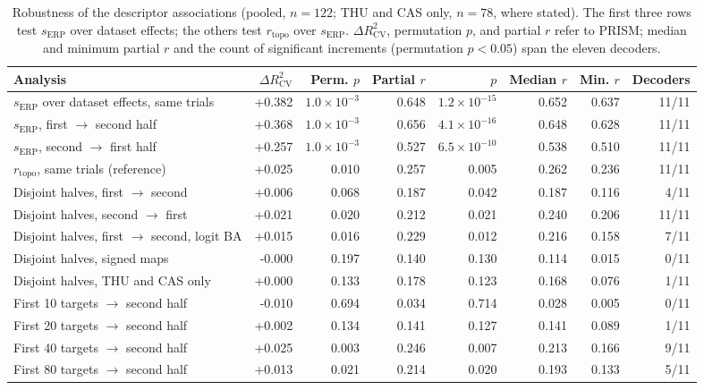 \begin{table}[H]
\centering
\caption{Robustness of the descriptor associations (pooled, $n=122$; THU and CAS only, $n=78$, where stated). The first three rows test $s_\mathrm{ERP}$ over dataset effects; the others test $r_\mathrm{topo}$ over $s_\mathrm{ERP}$. $\Delta R^2_\mathrm{CV}$, permutation $p$, and partial $r$ refer to PRISM; median and minimum partial $r$ and the count of significant increments (permutation $p<0.05$) span the eleven decoders.}
\label{tab:supp-robustness}
\scriptsize
\begin{adjustbox}{max width=\textwidth}
\begin{tabular}{@{}lrrrrrrr@{}}
\toprule
Analysis & $\Delta R^2_\mathrm{CV}$ & Perm. $p$ & Partial $r$ & $p$ & Median $r$ & Min. $r$ & Decoders \\
\midrule
$s_\mathrm{ERP}$ over dataset effects, same trials & +0.382 & $1.0\times10^{-3}$ & 0.648 & $1.2\times10^{-15}$ & 0.652 & 0.637 & 11/11 \\
$s_\mathrm{ERP}$, first $\to$ second half & +0.368 & $1.0\times10^{-3}$ & 0.656 & $4.1\times10^{-16}$ & 0.648 & 0.628 & 11/11 \\
$s_\mathrm{ERP}$, second $\to$ first half & +0.257 & $1.0\times10^{-3}$ & 0.527 & $6.5\times10^{-10}$ & 0.538 & 0.510 & 11/11 \\
\midrule
$r_\mathrm{topo}$, same trials (reference) & +0.025 & 0.010 & 0.257 & 0.005 & 0.262 & 0.236 & 11/11 \\
Disjoint halves, first $\to$ second & +0.006 & 0.068 & 0.187 & 0.042 & 0.187 & 0.116 & 4/11 \\
Disjoint halves, second $\to$ first & +0.021 & 0.020 & 0.212 & 0.021 & 0.240 & 0.206 & 11/11 \\
Disjoint halves, first $\to$ second, logit BA & +0.015 & 0.016 & 0.229 & 0.012 & 0.216 & 0.158 & 7/11 \\
Disjoint halves, signed maps & -0.000 & 0.197 & 0.140 & 0.130 & 0.114 & 0.015 & 0/11 \\
Disjoint halves, THU and CAS only & +0.000 & 0.133 & 0.178 & 0.123 & 0.168 & 0.076 & 1/11 \\
First 10 targets $\to$ second half & -0.010 & 0.694 & 0.034 & 0.714 & 0.028 & 0.005 & 0/11 \\
First 20 targets $\to$ second half & +0.002 & 0.134 & 0.141 & 0.127 & 0.141 & 0.089 & 1/11 \\
First 40 targets $\to$ second half & +0.025 & 0.003 & 0.246 & 0.007 & 0.213 & 0.166 & 9/11 \\
First 80 targets $\to$ second half & +0.013 & 0.021 & 0.214 & 0.020 & 0.193 & 0.133 & 5/11 \\

\end{tabular}
\end{adjustbox}
\end{table}
